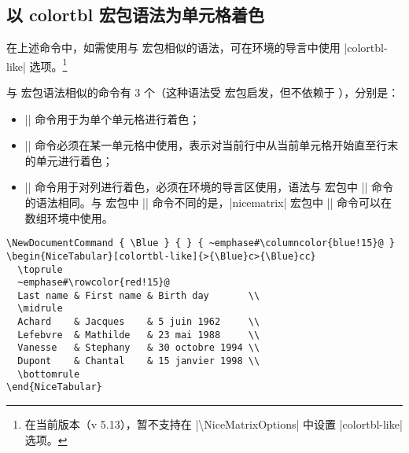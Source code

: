 \documentclass[dvipsnames]{article}%
\def\nicematrixfileversion{5.13}
\begin{document}
\subsection{以 colortbl 宏包语法为单元格着色}

在上述命令中，如需使用与  宏包相似的语法，可在环境的导言中使用 |colortbl-like| 选项。\footnote{在当前版本（v \nicematrixfileversion），暂不支持在 |\textbackslash NiceMatrixOptions| 中设置 |colortbl-like| 选项。}

与  宏包语法相似的命令有 3 个（这种语法受  宏包启发，但不依赖于 ），分别是：
\begin{itemize}
\item |\cellcolor| 命令用于为单个单元格进行着色；
\item |\rowcolor| 命令必须在某一单元格中使用，表示对当前行中从当前单元格开始直至行末的单元进行着色；\label{zm:rowcolor}
\item |\columncolor| 命令用于对列进行着色，必须在环境的导言区使用，语法与  宏包中 |\columncolor| 命令的语法相同。与  宏包中 |\columncolor| 命令不同的是，|nicematrix| 宏包中 |\columncolor| 命令可以在数组环境中使用。
\end{itemize}

\medskip
\begin{Verbatim}
\NewDocumentCommand { \Blue } { } { ~emphase#\columncolor{blue!15}@ }
\begin{NiceTabular}[colortbl-like]{>{\Blue}c>{\Blue}cc} 
  \toprule
  ~emphase#\rowcolor{red!15}@
  Last name & First name & Birth day       \\
  \midrule
  Achard    & Jacques    & 5 juin 1962     \\
  Lefebvre  & Mathilde   & 23 mai 1988     \\
  Vanesse   & Stephany   & 30 octobre 1994 \\
  Dupont    & Chantal    & 15 janvier 1998 \\
  \bottomrule
\end{NiceTabular}
\end{Verbatim}
\end{document}
